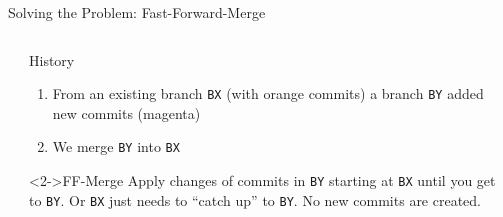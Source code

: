 \documentclass[xetex]{beamer}
\begin{document}
\begin{frame}[fragile]{Solving the Problem: Fast-Forward-Merge}
\begin{columns}
\begin{column}{.5\linewidth}
    \end{column}
    \begin{column}{.5\linewidth}
      \begin{exampleblock}{History}
        \begin{enumerate}
          \item From an existing branch \texttt{BX} (with orange commits) a
            branch \texttt{BY} added new commits (magenta)
          \item We merge \texttt{BY} into \texttt{BX}
        \end{enumerate}
      \end{exampleblock}
      \begin{alertblock}<2->{FF-Merge}
        Apply changes of commits in \texttt{BY} starting at \texttt{BX} until
        you get to \texttt{BY}. Or \texttt{BX} just needs to ``catch up'' to
        \texttt{BY}. No new commits are created.
      \end{alertblock}
    \end{column}
  \end{columns}
\end{frame}
\end{document}
